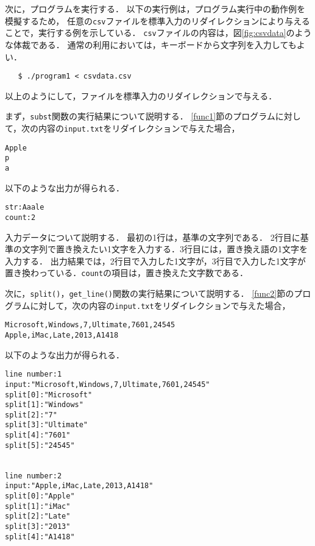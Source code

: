 次に，プログラムを実行する．
以下の実行例は，プログラム実行中の動作例を模擬するため，
任意の\verb|csv|ファイルを標準入力のリダイレクションにより与えることで，実行する例を示している\cite{www:label1}．
\verb|csv|ファイルの内容は，図\ref{fig:csvdata}のような体裁である．
通常の利用においては，キーボードから文字列を入力してもよい．

{\fontsize{10pt}{11pt} \selectfont
 \begin{verbatim}
   $ ./program1 < csvdata.csv
 \end{verbatim}
}

以上のようにして，ファイルを標準入力のリダイレクションで与える．

まず，\verb|subst|関数の実行結果について説明する．
\ref{func1}節のプログラムに対して，次の内容の\verb|input.txt|をリダイレクションで与えた場合，

{\fontsize{10pt}{11pt} \selectfont
 \begin{verbatim}
Apple
p
a
 \end{verbatim}
}

\noindent %
以下のような出力が得られる．

{\fontsize{10pt}{11pt} \selectfont
 \begin{verbatim}
str:Aaale
count:2
 \end{verbatim}
}

入力データについて説明する．
最初の1行は，基準の文字列である．
2行目に基準の文字列で置き換えたい1文字を入力する．3行目には，置き換え語の1文字を入力する．
出力結果では，2行目で入力した1文字が，3行目で入力した1文字が置き換わっている．\verb|count|の項目は，置き換えた文字数である．

次に，\verb|split()|，\verb|get_line()|関数の実行結果について説明する．
\ref{func2}節のプログラムに対して，次の内容の\verb|input.txt|をリダイレクションで与えた場合，

{\fontsize{10pt}{11pt} \selectfont
 \begin{verbatim}
Microsoft,Windows,7,Ultimate,7601,24545
Apple,iMac,Late,2013,A1418
 \end{verbatim}
}

\noindent %
以下のような出力が得られる．

{\fontsize{10pt}{11pt} \selectfont
 \begin{verbatim}
line number:1
input:"Microsoft,Windows,7,Ultimate,7601,24545"
split[0]:"Microsoft"
split[1]:"Windows"
split[2]:"7"
split[3]:"Ultimate"
split[4]:"7601"
split[5]:"24545"


line number:2
input:"Apple,iMac,Late,2013,A1418"
split[0]:"Apple"
split[1]:"iMac"
split[2]:"Late"
split[3]:"2013"
split[4]:"A1418"
 \end{verbatim}
}


